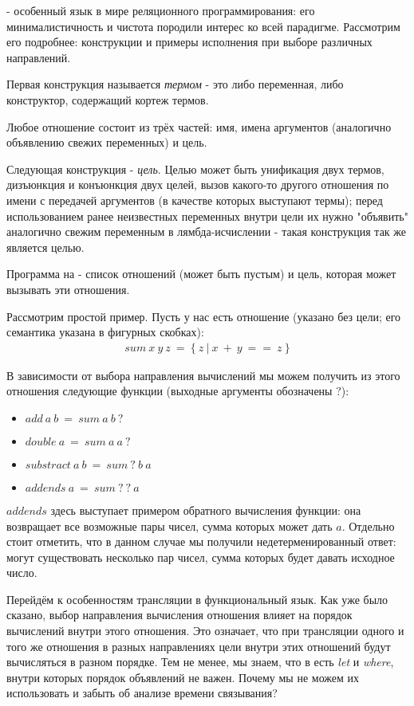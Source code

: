 \documentclass[conference]{IEEEtran}
\begin{document}
\miniKanren - особенный язык в мире реляционного программирования: его минималистичность и чистота породили интерес ко всей парадигме. Рассмотрим его подробнее: конструкции и примеры исполнения при выборе различных направлений.

Первая конструкция называется \emph{термом} - это либо переменная, либо конструктор, содержащий кортеж термов.

Любое отношение состоит из трёх частей: имя, имена аргументов (аналогично объявлению свежих переменных) и цель.

Следующая конструкция - \emph{цель}. Целью может быть унификация двух термов, дизъюнкция и конъюнкция двух целей, вызов какого-то другого отношения по имени с передачей аргументов (в качестве которых выступают термы); перед использованием ранее неизвестных переменных внутри цели их нужно "объявить" аналогично свежим переменным в лямбда-исчислении - такая конструкция так же является целью.

Программа на \miniKanren - список отношений (может быть пустым) и цель, которая может вызывать эти отношения.

Рассмотрим простой пример. Пусть у нас есть отношение (указано без цели; его семантика указана в фигурных скобках):
$$\begin{aligned}sum~x~y~z~=~\{~z~|~x~+~y~==~z~\}\end{aligned}$$

В зависимости от выбора направления вычислений мы можем получить из этого отношения следующие функции (выходные аргументы обозначены $?$):
\begin{itemize}
    \item $add~a~b~=~sum~a~b~?$
    \item $double~a~=~sum~a~a~?$
    \item $substract~a~b~=~sum~?~b~a$
    \item $addends~a~=~sum~?~?~a$
\end{itemize}

$addends$ здесь выступает примером обратного вычисления функции: она возвращает все возможные пары чисел, сумма которых может дать $a$. Отдельно стоит отметить, что в данном случае мы получили недетерменированный ответ: могут существовать несколько пар чисел, сумма которых будет давать исходное число.

Перейдём к особенностям трансляции в функциональный язык. Как уже было сказано, выбор направления вычисления отношения влияет на порядок вычислений внутри этого отношения. Это означает, что при трансляции одного и того же отношения в разных направлениях цели внутри этих отношений будут вычисляться в разном порядке. Тем не менее, мы знаем, что в \haskell есть \emph{let} и \emph{where}, внутри которых порядок объявлений не важен. Почему мы не можем их использовать и забыть об анализе времени связывания?
\end{document}
